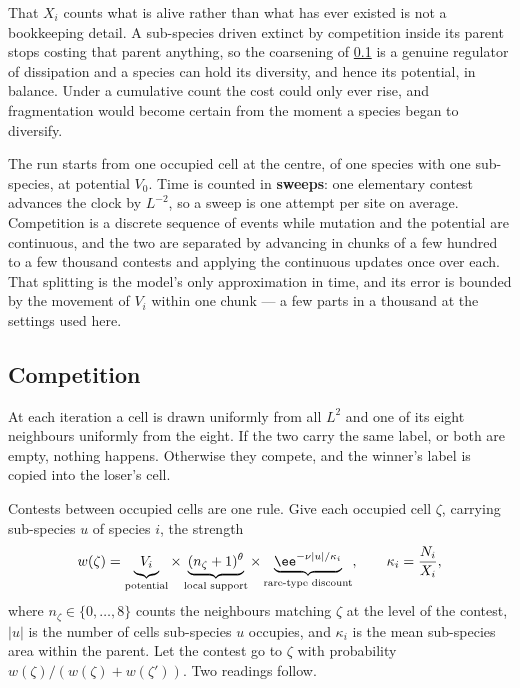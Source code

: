 That $X_i$ counts what is alive rather than what has ever existed is not a
bookkeeping detail. A sub-species driven extinct by competition inside its
parent stops costing that parent anything, so the coarsening of
\cref{var:sec:cacompetition} is a genuine regulator of dissipation and a
species can hold its diversity, and hence its potential, in balance. Under a
cumulative count the cost could only ever rise, and fragmentation would
become certain from the moment a species began to diversify.

The run starts from one occupied cell at the centre, of one species with one
sub-species, at potential $V_0$. Time is counted in \textbf{sweeps}: one
elementary contest advances the clock by $L^{-2}$, so a sweep is one attempt
per site on average. Competition is a discrete sequence of events while
mutation and the potential are continuous, and the two are separated by
advancing in chunks of a few hundred to a few thousand contests and applying
the continuous updates once over each. That splitting is the model's only
approximation in time, and its error is bounded by the movement of $V_i$
within one chunk --- a few parts in a thousand at the settings used here.

\subsection{Competition}
\label{var:sec:cacompetition}

At each iteration a cell is drawn uniformly from all $L^2$ and one of its
eight neighbours uniformly from the eight. If the two carry the same label,
or both are empty, nothing happens. Otherwise they compete, and the winner's
label is copied into the loser's cell.

Contests between occupied cells are one rule. Give each occupied cell $\zeta$,
carrying sub-species $u$ of species $i$, the strength
\begin{equation}
w(\zeta)=\underbrace{\vphantom{(n_\zeta+1)^\theta}V_i}_{\text{potential}}
\times\underbrace{(n_\zeta+1)^{\theta}}_{\text{local support}}
\times\underbrace{\ee^{-\nu|u|/\kappa_i}}_{\text{rare-type discount}},
\qquad
\kappa_i=\frac{N_i}{X_i},
\label{var:eq:castrength}
\end{equation}
where $n_\zeta\in\{0,\dots,8\}$ counts the neighbours matching $\zeta$ at the
level of the contest, $|u|$ is the number of cells sub-species $u$ occupies,
and $\kappa_i$ is the mean sub-species area within the parent. Let the
contest go to $\zeta$ with probability $w(\zeta)/(w(\zeta)+w(\zeta'))$. Two
readings follow.

